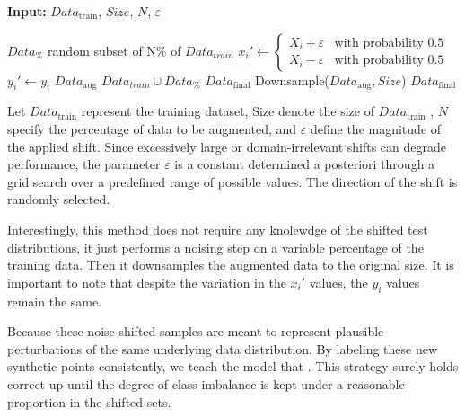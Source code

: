 \begin{algorithm}[H]
    \vspace{0.6em}
    \textbf{Input:} $Data_{\text{train}}$, $Size$, $N$, $\varepsilon$
    \vspace{0.6em}
    \begin{algorithmic}[1]
        \State $Data_{\%}$ \leftarrow random subset of N\% of $Data_{train}$
            \vspace{0.6em}
            \State $x_i' \leftarrow 
            \begin{cases}
                X_i + \varepsilon & \text{with probability } 0.5 \\
                X_i - \varepsilon & \text{with probability } 0.5
            \end{cases}$
            \State $y_i' \leftarrow y_i$
            \vspace{0.6em}
        \EndFor
        \vspace{0.6em}
        \State $Data_\text{aug}$ \leftarrow $Data_{train} \cup Data_{\%}$
        \State $Data_\text{final}$ \leftarrow Downsample($Data_\text{aug}, Size$)
        \vspace{0.6em}
        \State \Return $Data_{\text{final}}$
    \end{algorithmic}
    \caption{Let $Data_{\text{train}}$ represent the training dataset, $\text{Size}$ denote the size of $Data_{\text{train}}$ , $N$ specify the percentage of data to be augmented, and $\varepsilon$ define the magnitude of the applied shift. Since excessively large or domain-irrelevant shifts can degrade performance, the parameter $\varepsilon$ is a constant determined a posteriori through a grid search over a predefined range of possible values. The direction of the shift is randomly selected.}
\end{algorithm}



Interestingly, this method does not require any knolewdge of the shifted test distributions, it just performs a noising step on a variable percentage of the training data. Then it downsamples the augmented data to the original size.
It is important to note that despite the variation in the $x_i'$ values, the $y_i$ values remain the same.

\begin{tcolorbox}[colback=gray!5,colframe=gray!40,title= Why Keep the Same Label?]
    Because these noise-shifted samples are meant to represent plausible perturbations of the same underlying data distribution. By labeling these new synthetic points consistently, we teach the model that . This strategy surely holds correct up until the degree of class imbalance is kept under a reasonable proportion in the shifted sets.
\end{tcolorbox}





